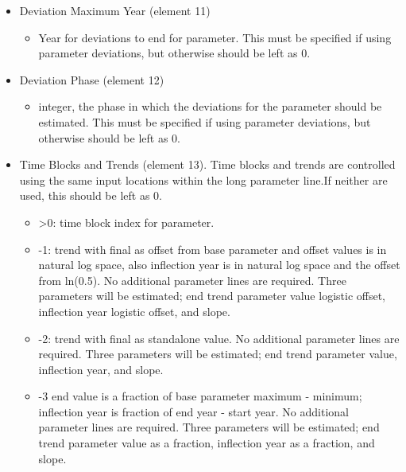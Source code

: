 \begin{itemize}
\item Deviation  Maximum Year (element 11)
	\begin{itemize}
		\item Year for deviations to end for parameter. This must be specified if using parameter deviations, but otherwise should be left as 0.
	\end{itemize}
	
\item Deviation Phase (element 12)
	\begin{itemize}
		\item integer, the phase in which the deviations for the parameter should be estimated. This must be specified if using parameter deviations, but otherwise should be left as 0.
	\end{itemize}
	
\item Time Blocks and Trends (element 13). Time blocks and trends are controlled using the same input locations within the long parameter line.If neither are used, this should be left as 0.
	\begin{itemize}
		\item >0: time block index for parameter.
		\item -1: trend with final as offset from base parameter and offset values is in natural log space, also inflection year is in natural log space and the offset from ln(0.5). No additional parameter lines are required.  Three parameters will be estimated; end trend parameter value logistic offset, inflection year logistic offset, and slope.
		\item -2: trend with final as standalone value. No additional parameter lines are required. Three parameters will be estimated; end trend parameter value, inflection year, and slope.
		\item -3 end value is a fraction of base parameter maximum - minimum; inflection year is fraction of end year - start year. No additional parameter lines are required. Three parameters will be estimated; end trend parameter value as a fraction, inflection year as a fraction, and slope.
	\end{itemize}
	

\end{itemize}
